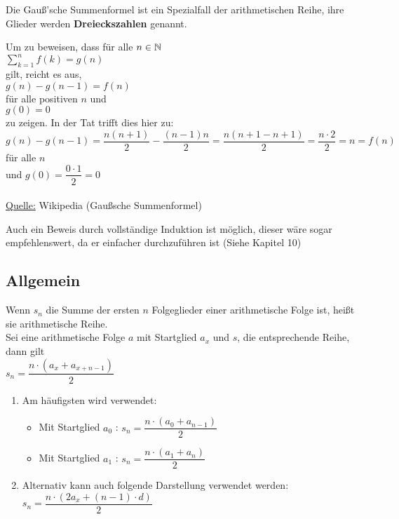 \documentclass[main.tex]{subfiles}
\begin{document}
\begin{Bemerkung}
Die Gauß'sche Summenformel ist ein Spezialfall der arithmetischen Reihe, ihre Glieder werden \textbf{Dreieckszahlen} genannt.
\end{Bemerkung}

\begin{Beweis}
Um zu beweisen, dass für alle $n\in\mathbb{N}$\\
$\sum\limits_{k=1}^{n}f(k)=g(n)$\\
 gilt, reicht es aus, \\
$g(n)-g(n-1)=f(n)$\\
 für alle positiven $n$ und\\
 $g(0)=0$\\
 zu zeigen. In der Tat trifft dies hier zu: \\
$g(n)-g(n-1)=\dfrac{n(n+1)}{2}-\dfrac{(n-1)n}{2}=\dfrac{n(n+1-n+1)}{2}=\dfrac{n\cdot 2}{2}=n=f(n)$ \\
für alle $n$ \\
und $g(0)=\dfrac{0\cdot 1}{2}=0$\\
\\
\underline{Quelle:} Wikipedia (Gaußsche Summenformel)\\
\end{Beweis}
\begin{Bemerkung}
Auch ein Beweis durch vollständige Induktion ist möglich, dieser wäre sogar empfehlenswert, da er einfacher durchzuführen ist (Siehe Kapitel 10)
\end{Bemerkung}


	\subsection{Allgemein}

\begin{Definition}
Wenn $s_{n}$ die Summe der ersten $n$ Folgeglieder einer arithmetische Folge ist, heißt sie arithmetische Reihe.\\
Sei eine arithmetische Folge $a$ mit Startglied $a_{x}$ und $s$, die entsprechende Reihe, dann gilt\\
$s_{n}=\dfrac{n\cdot(a_{x}+a_{x+n-1})}{2}$
\end{Definition}

\begin{Bemerkung}
\begin{enumerate}
\item Am häufigsten wird verwendet:
\begin{itemize}
\item Mit Startglied $a_{0}$ : $s_{n}=\dfrac{n\cdot(a_{0}+a_{n-1})}{2}$
\item Mit Startglied $a_{1}$ : $s_{n}=\dfrac{n\cdot(a_{1}+a_{n})}{2}$
\end{itemize}
\item Alternativ kann auch folgende Darstellung verwendet werden:\\
$s_{n}=\dfrac{n\cdot(2a_{x}+(n-1)\cdot d)}{2}$
\end{enumerate}
\end{Bemerkung}
\end{document}
